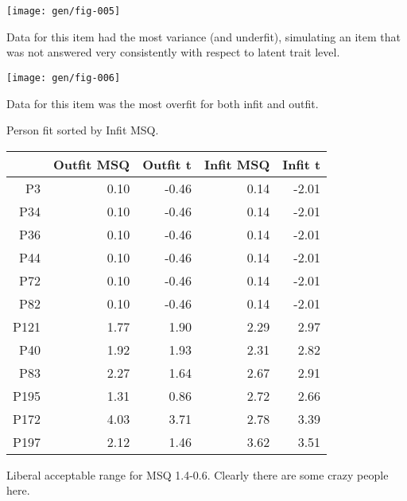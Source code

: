 \documentclass[10pt,utf8x]{beamer}
\begin{document}
\begin{frame}
\texttt{[image: gen/fig-005]}

Data for this item had the most variance (and underfit), simulating an
item that was not answered very consistently with respect to latent trait level.
\end{frame}

\begin{frame}
\texttt{[image: gen/fig-006]}

Data for this item was the most overfit for both infit and outfit.
\end{frame}

\begin{frame}
Person fit sorted by Infit MSQ.
\begin{table}[ht]
\begin{center}
\begin{tabular}{rrrrr}
  \hline
 & Outfit MSQ & Outfit t & Infit MSQ & Infit t \\ 
  \hline
P3 & 0.10 & -0.46 & 0.14 & -2.01 \\ 
  P34 & 0.10 & -0.46 & 0.14 & -2.01 \\ 
  P36 & 0.10 & -0.46 & 0.14 & -2.01 \\ 
  P44 & 0.10 & -0.46 & 0.14 & -2.01 \\ 
  P72 & 0.10 & -0.46 & 0.14 & -2.01 \\ 
  P82 & 0.10 & -0.46 & 0.14 & -2.01 \\ 
  P121 & 1.77 & 1.90 & 2.29 & 2.97 \\ 
  P40 & 1.92 & 1.93 & 2.31 & 2.82 \\ 
  P83 & 2.27 & 1.64 & 2.67 & 2.91 \\ 
  P195 & 1.31 & 0.86 & 2.72 & 2.66 \\ 
  P172 & 4.03 & 3.71 & 2.78 & 3.39 \\ 
  P197 & 2.12 & 1.46 & 3.62 & 3.51 \\ 
   \hline
\end{tabular}
\end{center}
\end{table}
Liberal acceptable range for MSQ 1.4-0.6. Clearly there are some
crazy people here.
\end{frame}
\end{document}
